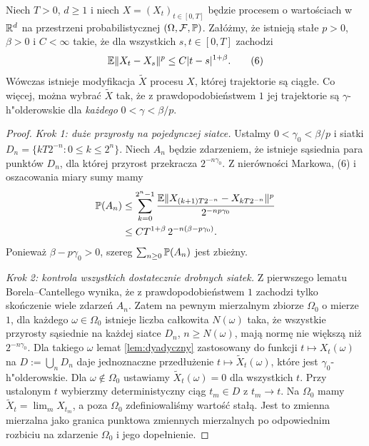 \begin{twierdzenie}
\label{thm:kol-cont}
Niech $T>0$, $d\ge1$ i niech
$X=(X_t)_{t\in[0,T]}$ będzie procesem o wartościach w $\mathbb{R}^d$
na przestrzeni probabilistycznej $(\Omega,\mathcal{F},\mathbb{P})$.
Załóżmy, że istnieją stałe $p>0$, $\beta>0$ i $C<\infty$
takie, że dla wszystkich $s,t\in[0,T]$ zachodzi
\[
\mathbb{E}\lVert X_t-X_s\rVert^{p}\le C\lvert t-s\rvert^{1+\beta}.
\tag{6}
\]
Wówczas istnieje modyfikacja $\widetilde X$ procesu $X$,
której trajektorie są ciągłe. Co więcej, można wybrać
$\widetilde X$ tak, że z prawdopodobieństwem $1$ jej
trajektorie są $\gamma$-h"olderowskie dla
\emph{każdego} $0<\gamma<\beta/p$.
\end{twierdzenie}
\begin{proof}
\emph{Krok 1: duże przyrosty na pojedynczej siatce.}
Ustalmy $0<\gamma_0<\beta/p$ i siatki
$D_n=\{kT2^{-n}:0\le k\le2^n\}$.
Niech $A_n$ będzie zdarzeniem, że istnieje sąsiednia
para punktów $D_n$, dla której przyrost przekracza
$2^{-n\gamma_0}$. Z nierówności Markowa, (6) i oszacowania
miary sumy mamy
\[
\begin{aligned}
\mathbb{P}(A_n)
&\le\sum_{k=0}^{2^n-1}
\frac{\mathbb{E}\lVert X_{(k+1)T2^{-n}}-X_{kT2^{-n}}\rVert^{p}}
{2^{-np\gamma_0}}\\
&\le C T^{1+\beta}\,2^{-n(\beta-p\gamma_0)}.
\end{aligned}
\]
Ponieważ $\beta-p\gamma_0>0$, szereg
$\sum_{n\ge0}\mathbb{P}(A_n)$ jest zbieżny.

\emph{Krok 2: kontrola wszystkich dostatecznie drobnych siatek.}
Z pierwszego lematu Borela--Cantellego wynika, że z
prawdopodobieństwem $1$ zachodzi tylko skończenie wiele
zdarzeń $A_n$. Zatem na pewnym mierzalnym zbiorze
$\Omega_0$ o mierze $1$, dla każdego $\omega\in\Omega_0$
istnieje liczba całkowita $N(\omega)$ taka, że
wszystkie przyrosty sąsiednie na każdej siatce
$D_n$, $n\ge N(\omega)$, mają normę nie większą niż
$2^{-n\gamma_0}$. Dla takiego $\omega$ lemat
\ref{lem:dyadyczny} zastosowany do funkcji
$t\mapsto X_t(\omega)$ na $D:=\bigcup_nD_n$
daje jednoznaczne przedłużenie
$t\mapsto\widetilde X_t(\omega)$, które jest
$\gamma_0$-h"olderowskie.
Dla $\omega\notin\Omega_0$ ustawiamy
$\widetilde X_t(\omega)=0$ dla wszystkich $t$.
Przy ustalonym $t$ wybierzmy deterministyczny ciąg
$t_m\in D$ z $t_m\to t$. Na $\Omega_0$ mamy
$\widetilde X_t=\lim_m X_{t_m}$, a poza $\Omega_0$
zdefiniowaliśmy wartość stałą. Jest to zmienna mierzalna
jako granica punktowa zmiennych mierzalnych po
odpowiednim rozbiciu na zdarzenie $\Omega_0$ i jego dopełnienie.


\end{proof}
